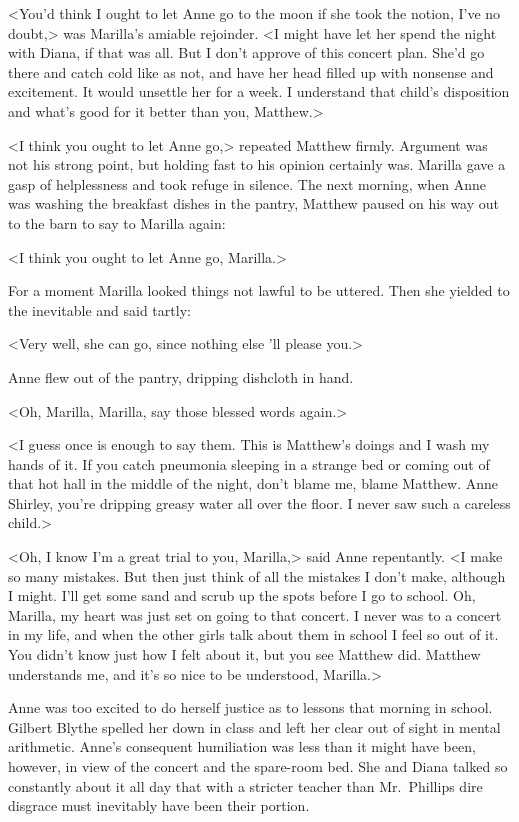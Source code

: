 <You'd think I ought to let Anne go to the moon if she took the notion, I've no doubt,> was Marilla's amiable rejoinder. <I might have let her spend the night with Diana, if that was all. But I don't approve of this concert plan. She'd go there and catch cold like as not, and have her head filled up with nonsense and excitement. It would unsettle her for a week. I understand that child's disposition and what's good for it better than you, Matthew.>

<I think you ought to let Anne go,> repeated Matthew firmly. Argument was not his strong point, but holding fast to his opinion certainly was. Marilla gave a gasp of helplessness and took refuge in silence. The next morning, when Anne was washing the breakfast dishes in the pantry, Matthew paused on his way out to the barn to say to Marilla again:

<I think you ought to let Anne go, Marilla.>

For a moment Marilla looked things not lawful to be uttered. Then she yielded to the inevitable and said tartly:

<Very well, she can go, since nothing else 'll please you.>

Anne flew out of the pantry, dripping dishcloth in hand.

<Oh, Marilla, Marilla, say those blessed words again.>

<I guess once is enough to say them. This is Matthew's doings and I wash my hands of it. If you catch pneumonia sleeping in a strange bed or coming out of that hot hall in the middle of the night, don't blame me, blame Matthew. Anne Shirley, you're dripping greasy water all over the floor. I never saw such a careless child.>

<Oh, I know I'm a great trial to you, Marilla,> said Anne repentantly. <I make so many mistakes. But then just think of all the mistakes I don't make, although I might. I'll get some sand and scrub up the spots before I go to school. Oh, Marilla, my heart was just set on going to that concert. I never was to a concert in my life, and when the other girls talk about them in school I feel so out of it. You didn't know just how I felt about it, but you see Matthew did. Matthew understands me, and it's so nice to be understood, Marilla.>

Anne was too excited to do herself justice as to lessons that morning in school. Gilbert Blythe spelled her down in class and left her clear out of sight in mental arithmetic. Anne's consequent humiliation was less than it might have been, however, in view of the concert and the spare-room bed. She and Diana talked so constantly about it all day that with a stricter teacher than Mr.~Phillips dire disgrace must inevitably have been their portion.

